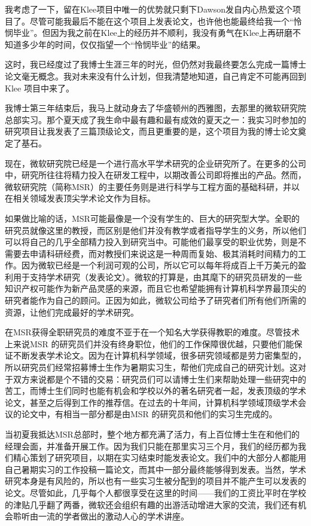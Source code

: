 \documentclass[12pt,UTF8,nofonts]{book}
\begin{document}
我考虑了一下，留在Klee项目中唯一的优势就只剩下Dawson发自内心热爱这个项目了。尽管可能我最后不能在这个项目上发表论文，也许他也能最终给我一个“怜悯毕业”。但因为我之前在Klee上的经历并不顺利，我没有勇气在Klee上再研磨不知道多少年的时间，仅仅指望一个“怜悯毕业”的结果。

这时，我已经度过了我博士生涯三年的时光，但仍然对我最终要怎么完成一篇博士论文毫无概念。我对未来没有什么计划，但我清楚地知道，自己肯定不可能再回到Klee 项目中来了。


我博士第三年结束后，我马上就动身去了华盛顿州的西雅图，去那里的微软研究院总部实习。那个夏天成了我生命中最有趣和最有成效的夏天之一：我实习时参加的研究项目让我发表了三篇顶级论文，而且更重要的是，这个项目为我的博士论文奠定了基石。

现在，微软研究院已经是一个进行高水平学术研究的企业研究所了。在更多的公司中，研究所往往将精力投入在研发工程中，以期改善公司即将推出的产品。然而，微软研究院（简称MSR）的主要任务则是进行科学与工程方面的基础科研，并以在相关领域发表顶尖学术论文作为目标。

如果做比喻的话，MSR可能最像是一个没有学生的、巨大的研究型大学。全职的研究员就像这里的教授，而区别是他们并没有教学或者指导学生的义务，所以他们可以将自己的几乎全部精力投入到研究当中。可能他们最享受的职业优势，则是不需要去申请科研经费，而对教授们来说这是一种周而复始、极其消耗时间精力的工作。因为微软已经是一个利润可观的公司，所以它可以每年将成百上千万美元的盈利用于支持学术研究（发表论文）。微软的打算是，由其麾下的研究员研发的一些知识产权可能作为新产品灵感的来源，而且它也希望能拥有计算机科学界最顶尖的研究者能作为自己的顾问。正因为如此，微软公司给予了研究者们所有他们所需的资源，让他们完成最好的学术研究。

在MSR获得全职研究员的难度不亚于在一个知名大学获得教职的难度。尽管技术上来说MSR 的研究员们并没有终身职位，他们的工作保障很优越，只要他们能保证不断发表学术论文。因为在计算机科学领域，很多研究领域都是劳力密集型的，所以研究员们经常招募博士生作为暑期实习生，帮他们完成自己的研究计划。这对于双方来说都是个不错的交易：研究员们可以请博士生们来帮助处理一些研究中的苦工，而博士生们同时也能有机会和学校以外的著名研究者一起，发表顶级的学术论文，甚至之后得到工作的推荐信。在过去的十年间，计算机科学领域顶级学术会议的论文中，有相当一部分都是由MSR 的研究员和他们的实习生完成的。

当初夏我抵达MSR总部时，整个地方都充满了活力，有上百位博士生在和他们的经理会面，并准备开展工作。因为我们只能在那里实习三个月，我们的经历都为我们精心策划了研究项目，以期在实习结束时能发表论文。我们中的大部分人都能用自己暑期实习的工作投稿一篇论文，而其中一部分最终能够得到发表。当然，学术研究本身是有风险的，所以也有一些实习生被分配到的项目并不能产生可以发表的论文。尽管如此，几乎每个人都很享受在这里的时间——我们的工资比平时在学校的津贴几乎翻了两番，微软还会组织有趣的出游活动增进大家的交流，我们还有机会聆听由一流的学者做出的激动人心的学术讲座。
\end{document}
